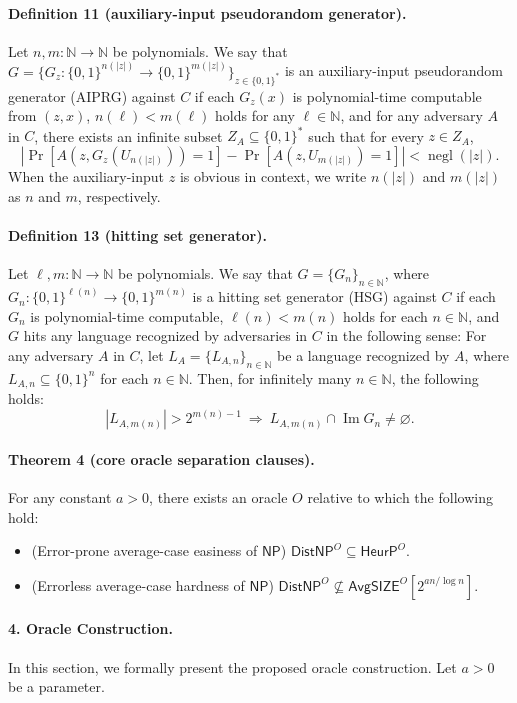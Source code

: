 \documentclass[10pt,a4paper]{article}
\begin{document}
\paragraph{Definition 11 (auxiliary-input pseudorandom generator).}
Let $n,m:\mathbb N\to\mathbb N$ be polynomials. We say that $G=\{G_z:\{0,1\}^{n(|z|)}\to\{0,1\}^{m(|z|)}\}_{z\in\{0,1\}^*}$ is an auxiliary-input pseudorandom generator (AIPRG) against $C$ if each $G_z(x)$ is polynomial-time computable from $(z,x)$, $n(\ell)<m(\ell)$ holds for any $\ell\in\mathbb N$, and for any adversary $A$ in $C$, there exists an infinite subset $Z_A\subseteq\{0,1\}^*$ such that for every $z\in Z_A$,
\[\left|\Pr[A(z,G_z(U_{n(|z|)}))=1]-\Pr[A(z,U_{m(|z|)})=1]\right|<\operatorname{negl}(|z|).\]
When the auxiliary-input $z$ is obvious in context, we write $n(|z|)$ and $m(|z|)$ as $n$ and $m$, respectively.
\paragraph{Definition 13 (hitting set generator).}
Let $\ell,m:\mathbb N\to\mathbb N$ be polynomials. We say that $G=\{G_n\}_{n\in\mathbb N}$, where $G_n:\{0,1\}^{\ell(n)}\to\{0,1\}^{m(n)}$ is a hitting set generator (HSG) against $C$ if each $G_n$ is polynomial-time computable, $\ell(n)<m(n)$ holds for each $n\in\mathbb N$, and $G$ hits any language recognized by adversaries in $C$ in the following sense: For any adversary $A$ in $C$, let $L_A=\{L_{A,n}\}_{n\in\mathbb N}$ be a language recognized by $A$, where $L_{A,n}\subseteq\{0,1\}^n$ for each $n\in\mathbb N$. Then, for infinitely many $n\in\mathbb N$, the following holds:
\[|L_{A,m(n)}|>2^{m(n)-1}\ \Longrightarrow\ L_{A,m(n)}\cap\operatorname{Im}G_n\neq\varnothing.\]

\paragraph{Theorem 4 (core oracle separation clauses).}
For any constant $a>0$, there exists an oracle $O$ relative to which the following hold:
\begin{itemize}
\item (Error-prone average-case easiness of $\mathsf{NP}$) $\mathsf{DistNP}^{O}\subseteq\mathsf{HeurP}^{O}$.
\item (Errorless average-case hardness of $\mathsf{NP}$) $\mathsf{DistNP}^{O}\not\subseteq\mathsf{AvgSIZE}^{O}[2^{an/\log n}]$.
\end{itemize}

\paragraph{4. Oracle Construction.}
In this section, we formally present the proposed oracle construction. Let $a>0$ be a parameter.
\end{document}
